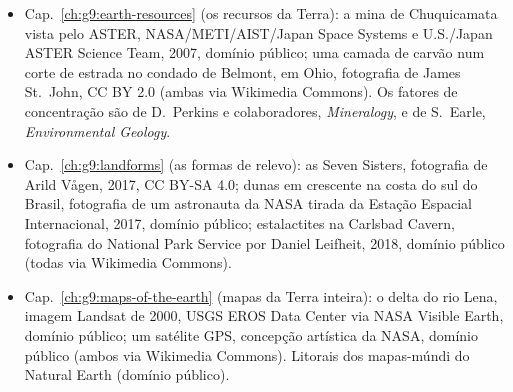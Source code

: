 \begin{itemize}
  \item Cap.~\ref{ch:g9:earth-resources} (os recursos da Terra): a mina de Chuquicamata vista pelo ASTER, NASA/METI/AIST/Japan Space Systems e U.S./Japan ASTER Science Team, 2007, domínio público; uma camada de carvão num corte de estrada no condado de Belmont, em Ohio, fotografia de James St.~John, CC BY 2.0 (ambas via Wikimedia Commons). Os fatores de concentração são de D.~Perkins e colaboradores, \emph{Mineralogy}, e de S.~Earle, \emph{Environmental Geology}.
  \item Cap.~\ref{ch:g9:landforms} (as formas de relevo): as Seven Sisters, fotografia de Arild Vågen, 2017, CC BY-SA 4.0; dunas em crescente na costa do sul do Brasil, fotografia de um astronauta da NASA tirada da Estação Espacial Internacional, 2017, domínio público; estalactites na Carlsbad Cavern, fotografia do National Park Service por Daniel Leifheit, 2018, domínio público (todas via Wikimedia Commons).
  \item Cap.~\ref{ch:g9:maps-of-the-earth} (mapas da Terra inteira): o delta do rio Lena, imagem Landsat de 2000, USGS EROS Data Center via NASA Visible Earth, domínio público; um satélite GPS, concepção artística da NASA, domínio público (ambos via Wikimedia Commons). Litorais dos mapas-múndi do Natural Earth (domínio público).
\end{itemize}
